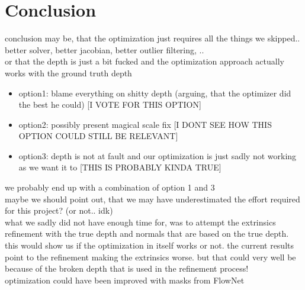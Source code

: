 \chapter{Conclusion}
    conclusion may be, that the optimization just requires all the things we skipped.. better solver, better jacobian, better outlier filtering, ..\\
    or that the depth is just a bit fucked and the optimization approach actually works with the ground truth depth
    \begin{itemize}
        \item option1: blame everything on shitty depth (arguing, that the optimizer did the best he could) [I VOTE FOR THIS OPTION]
        \item option2: possibly present magical scale fix [I DONT SEE HOW THIS OPTION COULD STILL BE RELEVANT]
        \item option3: depth is not at fault and our optimization is just sadly not working as we want it to [THIS IS PROBABLY KINDA TRUE]
    \end{itemize}
    we probably end up with a combination of option 1 and 3\\
    maybe we should point out, that we may have underestimated the effort required for this project? (or not.. idk)\\
    what we sadly did not have enough time for, was to attempt the extrinsics refinement with the true depth and normals that are based on the true depth. this would show us if the optimization in itself works or not. the current results point to the refinement making the extrinsics worse. but that could very well be because of the broken depth that is used in the refinement process!\\
    optimization could have been improved with masks from FlowNet\\